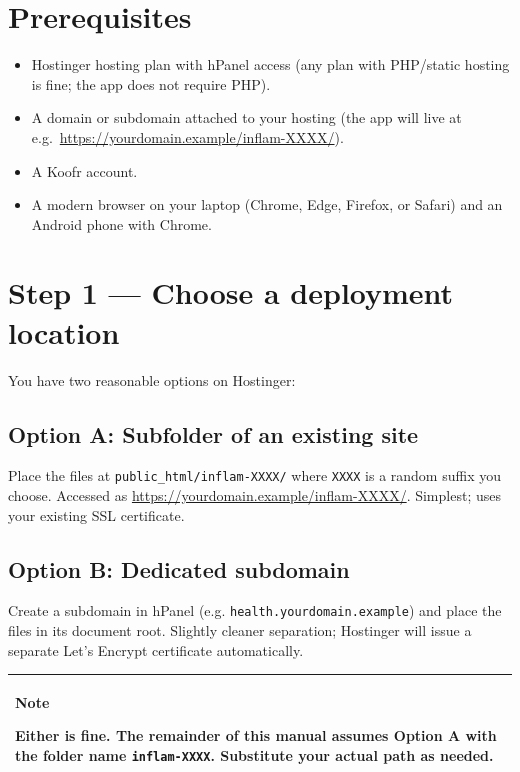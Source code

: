 \documentclass[11pt,a4paper]{article}
\newcommand{\callout}[3]{%
  \begin{center}%
  \begin{tabularx}{\linewidth}{|>{\columncolor{#1}}X|}%
  \hline
  \textbf{#2}\par\smallskip #3\\[2pt]
  \hline
  \end{tabularx}%
  \end{center}%
}
\newcommand{\notebox}[1]{\callout{notebg}{Note}{#1}}
\begin{document}
\section{Prerequisites}

\begin{itemize}[leftmargin=*]
  \item Hostinger hosting plan with hPanel access (any plan with PHP/static hosting is fine; the app does not require PHP).
  \item A domain or subdomain attached to your hosting (the app will live at e.g.\ \url{https://yourdomain.example/inflam-XXXX/}).
  \item A Koofr account.
  \item A modern browser on your laptop (Chrome, Edge, Firefox, or Safari) and an Android phone with Chrome.
\end{itemize}

\section{Step 1 --- Choose a deployment location}

You have two reasonable options on Hostinger:

\subsection*{Option A: Subfolder of an existing site}
Place the files at \texttt{public\_html/inflam-XXXX/} where \texttt{XXXX} is a random suffix you choose. Accessed as \url{https://yourdomain.example/inflam-XXXX/}. Simplest; uses your existing SSL certificate.

\subsection*{Option B: Dedicated subdomain}
Create a subdomain in hPanel (e.g. \texttt{health.yourdomain.example}) and place the files in its document root. Slightly cleaner separation; Hostinger will issue a separate Let's Encrypt certificate automatically.

\notebox{Either is fine. The remainder of this manual assumes Option A with the folder name \texttt{inflam-XXXX}. Substitute your actual path as needed.}
\end{document}
